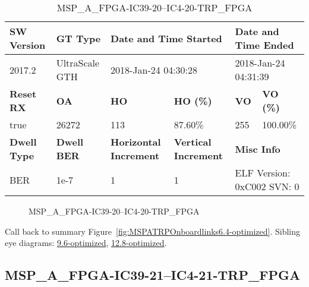 \begin{table}[h]
\centering
\caption{MSP\_A\_FPGA-IC39-20--IC4-20-TRP\_FPGA}
\label{tab:MSPAFPGAIC3920IC420TRPFPGA6.4-optimized}
\begin{tabular}{@{}|l|l|l|l|l|l|@{}}
\toprule
\textbf{SW Version}                & \textbf{GT Type}   & \multicolumn{2}{l|}{\textbf{Date and Time Started}}            & \multicolumn{2}{l|}{\textbf{Date and Time Ended}}        \\ \midrule
2017.2                       & UltraScale GTH          & \multicolumn{2}{l|}{2018-Jan-24 04:30:28}                   & \multicolumn{2}{l|}{2018-Jan-24 04:31:39}               \\ \midrule
\textbf{Reset RX}                  & \textbf{OA} & \textbf{HO}   & \textbf{HO (\%)} & \textbf{VO} & \textbf{VO (\%)} \\ \midrule
true & 26272        & 113          & 87.60\%        & 255        & 100.00\%       \\ \midrule
\textbf{Dwell Type}                & \textbf{Dwell BER} & \textbf{Horizontal Increment} & \textbf{Vertical Increment}    & \multicolumn{2}{l|}{\textbf{Misc Info}}                  \\ \midrule
BER                            & 1e-7        & 1        & 1           & \multicolumn{2}{l|}{ELF Version: 0xC002 SVN: 0}                         \\ \bottomrule
\end{tabular}
\end{table}

\begin{figure}[h]
\caption{MSP\_A\_FPGA-IC39-20--IC4-20-TRP\_FPGA} \label{fig:MSPAFPGAIC3920IC420TRPFPGA6.4-optimized}
\end{figure}

Call back to summary Figure~\ref{fig:MSPATRPOnboardlinks6.4-optimized}.
Sibling eye diagrams: \hyperref[sec:MSPAFPGAIC3920IC420TRPFPGA9.6-optimized]{9.6-optimized}, \hyperref[sec:MSPAFPGAIC3920IC420TRPFPGA12.8-optimized]{12.8-optimized}.

\clearpage
\newpage


\subsection{MSP\_A\_FPGA-IC39-21--IC4-21-TRP\_FPGA}\label{sec:MSPAFPGAIC3921IC421TRPFPGA6.4-optimized}

